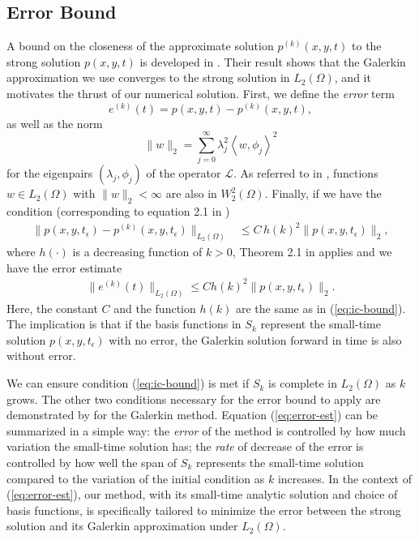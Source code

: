 \subsection{Error Bound} \label{sec:error-bound}
A bound on the closeness of the approximate solution $p^{(k)}(x,y,t)$
to the strong solution $p(x,y,t)$ is developed in
\cite{bramble1977some}.  Their result shows that the Galerkin
approximation we use converges to the strong solution in
$L_2(\Omega)$, and it motivates the thrust of our numerical
solution. First, we define the \textit{error} term
\[
  e^{(k)}(t) = p(x,y,t) - p^{(k)}(x,y,t),
\]
as well as the norm
\[
  \| w \|_2 = \sum_{j=0}^\infty \lambda_j^2 \left<w, \phi_j\right>^2
\]
for the eigenpairs $(\lambda_j, \phi_j)$ of the operator
$\mathcal{L}$. As referred to in \cite{bramble1977some}, functions
$w \in L_2(\Omega)$ with $\|w\|_2 < \infty$ are also in
$W_2^2(\Omega)$. Finally, if we have the condition (corresponding to
equation 2.1 in \cite{bramble1977some})
\begin{align}
  \| p(x,y,t_\epsilon) - p^{(k)}(x,y,t_\epsilon) \|_{L_2(\Omega)} &\leq C\, h(k)^2 \| p(x,y,t_\epsilon) \|_2, \label{eq:ic-bound}
\end{align}
where $h(\cdot)$ is a decreasing function of $k > 0$, Theorem 2.1 in
\cite{bramble1977some} applies and we have the error estimate
\begin{align}
  \| e^{(k)}(t) \|_{L_2(\Omega)} \leq C h(k)^2 \| p(x,y,t_\epsilon) \|_{2}. \label{eq:error-est}
\end{align}
Here, the  constant $C$  and the  function $h(k)$ are  the same  as in
(\ref{eq:ic-bound}). The implication is that if the basis functions in
$S_k$ represent  the small-time  solution $p(x,y,t_\epsilon)$  with no
error, the Galerkin solution forward in time is also without error.

We can ensure condition (\ref{eq:ic-bound}) is met if $S_k$ is
complete in $L_2(\Omega)$ as $k$ grows. The other two conditions
necessary for the error bound to apply are demonstrated by
\cite{bramble1977some} for the Galerkin method. Equation
(\ref{eq:error-est}) can be summarized in a simple way: the
\textit{error} of the method is controlled by how much variation the
small-time solution has; the \textit{rate} of decrease of the error is
controlled by how well the span of $S_k$ represents the small-time
solution compared to the variation of the initial condition as $k$
increases. In the context of (\ref{eq:error-est}), our method, with
its small-time analytic solution and choice of basis functions, is
specifically tailored to minimize the error between the strong
solution and its Galerkin approximation under $L_2(\Omega)$.

